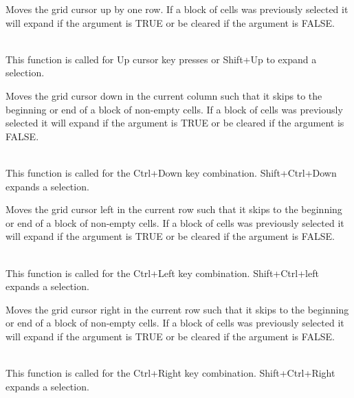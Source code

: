 {\label{wxgridmovecursorup}


Moves the grid cursor up by one row. If a block of cells was previously selected it
will expand if the argument is TRUE or be cleared if the argument is FALSE.

\\
This function is called for Up cursor key presses or Shift+Up to expand a selection.

\label{wxgridmovecursordownblock}


Moves the grid cursor down in the current column such that it skips to the beginning or
end of a block of non-empty cells. If a block of cells was previously selected it
will expand if the argument is TRUE or be cleared if the argument is FALSE.

\\
This function is called for the Ctrl+Down key combination. Shift+Ctrl+Down expands a selection.

\label{wxgridmovecursorleftblock}


Moves the grid cursor left in the current row such that it skips to the beginning or
end of a block of non-empty cells. If a block of cells was previously selected it
will expand if the argument is TRUE or be cleared if the argument is FALSE.

\\
This function is called for the Ctrl+Left key combination. Shift+Ctrl+left expands a selection.

\label{wxgridmovecursorrightblock}


Moves the grid cursor right in the current row such that it skips to the beginning or
end of a block of non-empty cells. If a block of cells was previously selected it
will expand if the argument is TRUE or be cleared if the argument is FALSE.

\\
This function is called for the Ctrl+Right key combination. Shift+Ctrl+Right expands a selection.

}
